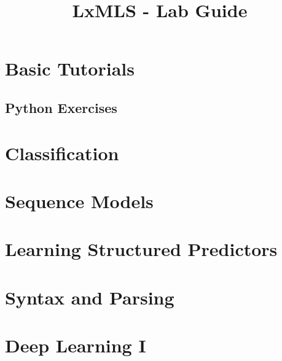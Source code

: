 \documentclass{report}
\begin{document}
\title{LxMLS - Lab Guide}

\maketitle

\renewcommand{\chaptername}{Day}
\setcounter{chapter}{-1}

\chapter{Basic Tutorials}


%

\section{Python Exercises}


\chapter{\label{day:classification}Classification}



\chapter{\label{day:seq}Sequence Models}


\chapter{\label{day:seq_disc}Learning Structured Predictors}



\chapter{Syntax and Parsing}


\chapter{Deep Learning I}

\end{document}
